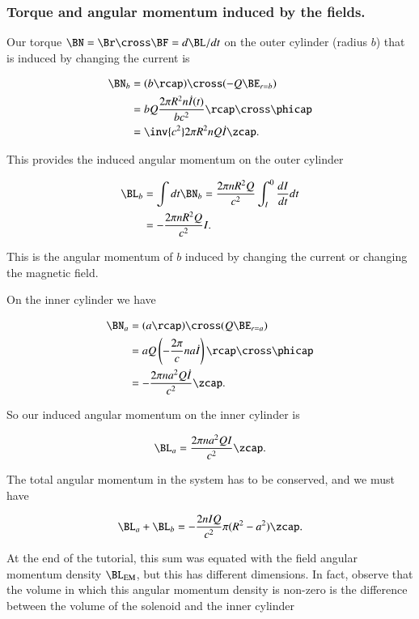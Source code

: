 \subsubsection{Torque and angular momentum induced by the fields.}

Our torque $\BN = \Br \cross \BF = d\BL/dt$ on the outer cylinder (radius $b$) that is induced by changing the current is

\begin{align*}
\BN_b
&= (b \rcap) \cross (-Q \BE_{r = b}) \\
&= b Q \frac{2 \pi R^2 n \dot{I}(t)}{b c^2} \rcap \cross \phicap \\
&= \inv{c^2} 2 \pi R^2 n Q \dot{I} \zcap.
\end{align*}

This provides the induced angular momentum on the outer cylinder

\begin{align*}
\BL_b
&= \int dt \BN_b = \frac{ 2 \pi n R^2 Q}{c^2} \int_I^0 \frac{dI}{dt} dt \\
&= -\frac{2 \pi n R^2 Q}{c^2} I.
\end{align*}

This is the angular momentum of $b$ induced by changing the current or changing the magnetic field.

On the inner cylinder we have

\begin{align*}
\BN_a
&= (a \rcap ) \cross (Q \BE_{r = a}) \\
&= a Q \left(- \frac{2 \pi}{c} n a \dot{I} \right) \rcap \cross \phicap \\
&= -\frac{2 \pi n a^2 Q \dot{I}}{c^2} \zcap.
\end{align*}

So our induced angular momentum on the inner cylinder is

\begin{equation}\label{eqn:relativisticElectrodynamicsT5:330}
\BL_a = \frac{2 \pi n a^2 Q I}{c^2} \zcap.
\end{equation}

The total angular momentum in the system has to be conserved, and we must have

\begin{equation}\label{eqn:relativisticElectrodynamicsT5:350}
\BL_a + \BL_b = -\frac{2 n I Q}{c^2} \pi (R^2 - a^2) \zcap.
\end{equation}

At the end of the tutorial, this sum was equated with the field angular momentum density $\BL_{\text{EM}}$, but this has different dimensions.  In fact, observe that the volume in which this angular momentum density is non-zero is the difference between the volume of the solenoid and the inner cylinder

